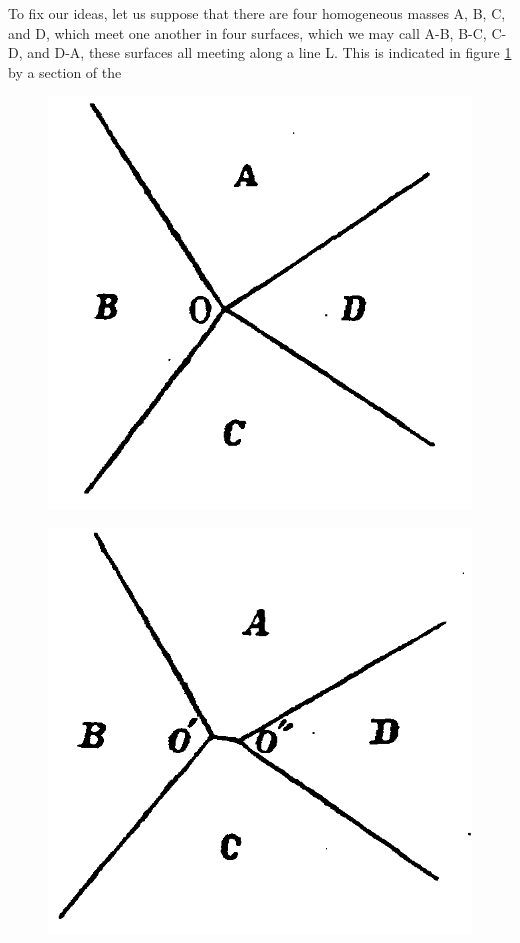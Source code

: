\documentclass[12pt]{memoir}
\begin{document}
To fix our ideas, let us suppose that there are four homogeneous masses A, B, C, and D, which meet one another in four surfaces, which we may call A-B, B-C, C-D, and D-A, these surfaces all meeting along a line L. This is indicated in figure \ref{fig_11} by a section of the
\begin{figure}
\centering
\begin{minipage}{.3\textwidth}
  \centering
  \includegraphics[width=\linewidth]{fig_11}
  \label{fig_11}
\end{minipage}%
\begin{minipage}{.3\textwidth}
  \centering
  \includegraphics[width=\linewidth]{fig_12}

\end{minipage}
\end{figure}
\end{document}
